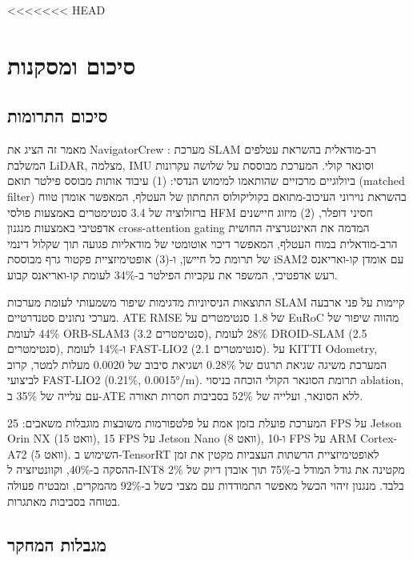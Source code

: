 <<<<<<< HEAD


\section{סיכום ומסקנות}
\label{sec:ch09_conclusion}

\subsection{סיכום התרומות}
\label{sec:ch09_contributions}

מאמר זה הציג את NavigatorCrew : מערכת SLAM רב-מודאלית בהשראת עטלפים המשלבת LiDAR, מצלמה, IMU וסונאר קולי. המערכת מבוססת על שלושה עקרונות ביולוגיים מרכזיים שהותאמו למימוש הנדסי: (1) עיבוד אותות מבוסס פילטר תואם (matched filter) בהשראת נוירוני העיכוב-מתואם בקוליקולוס התחתון של העטלף, המאפשר אומדן טווח ברזולוציה של 3.4 סנטימטרים באמצעות פולסי HFM חסיני דופלר, (2) מיזוג חיישנים אדפטיבי באמצעות מנגנון cross-attention gating המדמה את האינטגרציה החושית הרב-מודאלית במוח העטלף, המאפשר דיכוי אוטומטי של מודאליות פגועה תוך שקלול דינמי של תרומת כל חיישן, ו-(3) אופטימיזציית פקטור גרף מבוססת iSAM2 עם אומדן קו-ואריאנס רעש אדפטיבי, המשפר את עקביות הפילטר ב-34\% לעומת קו-ואריאנס קבוע.

התוצאות הניסיוניות מדגימות שיפור משמעותי לעומת מערכות SLAM קיימות על פני ארבעה מערכי נתונים סטנדרטיים. ATE RMSE של 1.8 סנטימטרים על EuRoC מהווה שיפור של 44\% לעומת ORB-SLAM3 (3.2 סנטימטרים), 28\% לעומת DROID-SLAM (2.5 סנטימטרים), ו-14\% לעומת FAST-LIO2 (2.1 סנטימטרים). על KITTI Odometry, המערכת משיגה שגיאת תרגום של 0.28\% ושגיאת סיבוב של 0.0020 מעלות למטר, קרוב לביצועי FAST-LIO2 (0.21\%, 0.0015°/m). תרומת הסונאר הקולי הוכחה בניסוי ablation, עם עלייה של 35\% ב-ATE ללא הסונאר, ועלייה של 52\% בסביבות חסרות תאורה.

המערכת פועלת בזמן אמת על פלטפורמות משובצות מוגבלות משאבים: 25 FPS על Jetson Orin NX (15 וואט), 15 FPS על Jetson Nano (8 וואט), ו-10 FPS על ARM Cortex-A72 (5 וואט). השימוש ב-TensorRT לאופטימיזציית הרשתות העצביות מקטין את זמן ההסקה ב-40\%, וקוונטיזציה ל-INT8 מקטינה את גודל המודל ב-75\% תוך אובדן דיוק של 2\% בלבד. מנגנון זיהוי הכשל מאפשר התמודדות עם מצבי כשל ב-92\% מהמקרים, ומבטיח פעולה בטוחה בסביבות מאתגרות.

\subsection{מגבלות המחקר}
\label{sec:ch09_limitations}

